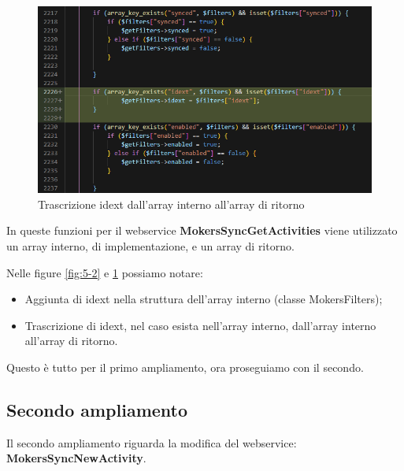 \begin{figure}[!h] 
	\centering
	\includegraphics[scale = 0.5]{immagini/webservices/ampliamenti/1ampl_mokers_getidext.png}
	\caption{Trascrizione idext dall'array interno all'array di ritorno}
	\label{fig:5-3}
\end{figure}
\newspace
\newspace
\begin{flushleft}
	In queste funzioni per il webservice \textbf{MokersSyncGetActivities} viene utilizzato un array interno, di implementazione, e un array di ritorno.
	
	Nelle figure \ref{fig:5-2} e \ref{fig:5-3} possiamo notare:
	\begin{itemize}
		\item Aggiunta di idext nella struttura dell'array interno (classe MokersFilters);
		\item Trascrizione di idext, nel caso esista nell'array interno, dall'array interno all'array di ritorno.
	\end{itemize}
	
	Questo è tutto per il primo ampliamento, ora proseguiamo con il secondo.
\end{flushleft}
\newpage

\subsection{Secondo ampliamento}
Il secondo ampliamento riguarda la modifica del webservice: \\ \textbf{MokersSyncNewActivity}.

